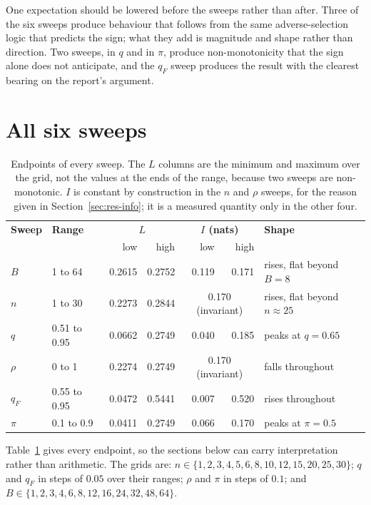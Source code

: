 One expectation should be lowered before the sweeps rather than after. Three of the six
sweeps produce behaviour that follows from the same adverse-selection logic that predicts
the sign; what they add is magnitude and shape rather than direction. Two sweeps, in $q$ and
in $\pi$, produce non-monotonicity that the sign alone does not anticipate, and the $q_F$
sweep produces the result with the clearest bearing on the report's argument.

\section{All six sweeps}
\label{sec:res-table}

\begin{table}[htbp]
\centering
\small
\begin{tabularx}{\textwidth}{llrrrrX}
\toprule
\textbf{Sweep} & \textbf{Range} & \multicolumn{2}{c}{\textbf{$L$}} & \multicolumn{2}{c}{\textbf{$I$ (nats)}} & \textbf{Shape} \\
 & & low & high & low & high & \\
\midrule
$B$    & 1 to 64        & 0.2615 & 0.2752 & 0.119 & 0.171 & rises, flat beyond $B=8$ \\
$n$    & 1 to 30        & 0.2273 & 0.2844 & \multicolumn{2}{c}{0.170 (invariant)} & rises, flat beyond $n{\approx}25$ \\
$q$    & 0.51 to 0.95   & 0.0662 & 0.2749 & 0.040 & 0.185 & peaks at $q=0.65$ \\
$\rho$ & 0 to 1         & 0.2274 & 0.2749 & \multicolumn{2}{c}{0.170 (invariant)} & falls throughout \\
$q_F$  & 0.55 to 0.95   & 0.0472 & 0.5441 & 0.007 & 0.520 & rises throughout \\
$\pi$  & 0.1 to 0.9     & 0.0411 & 0.2749 & 0.066 & 0.170 & peaks at $\pi=0.5$ \\
\bottomrule
\end{tabularx}
\caption{Endpoints of every sweep. The $L$ columns are the minimum and maximum over the
grid, not the values at the ends of the range, because two sweeps are non-monotonic. $I$ is
constant by construction in the $n$ and $\rho$ sweeps, for the reason given in
Section~\ref{sec:res-info}; it is a measured quantity only in the other four.}
\label{tab:results}
\end{table}

Table~\ref{tab:results} gives every endpoint, so the sections below can carry interpretation
rather than arithmetic. The grids are: $n \in \{1,2,3,4,5,6,8,10,12,15,20,25,30\}$;
$q$ and $q_F$ in steps of $0.05$ over their ranges; $\rho$ and $\pi$ in steps of $0.1$;
and $B \in \{1,2,3,4,6,8,12,16,24,32,48,64\}$.

